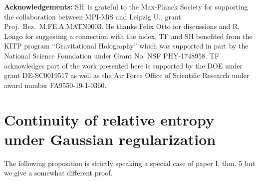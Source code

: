 \documentclass[english,a4paper,12pt]{article}
\begin{document}
\vspace{1cm}

{\bf Acknowledgements:} SH\ is grateful to the Max-Planck Society for supporting the collaboration between MPI-MiS and Leipzig U., grant Proj.~Bez.\ M.FE.A.MATN0003. He thanks Felix Otto for discussions and R. Longo for suggesting a connection with the index.
TF and SH benefited from the KITP program ``Gravitational Holography'' which was supported in part by the National Science Foundation under Grant No. NSF PHY-1748958.
TF acknowledges part of the work presented here is supported by the DOE under grant DE-SC0019517 as well as the Air Force Office of Scientific Research under award number FA9550-19-1-0360.



\appendix

\section{Continuity of relative entropy under Gaussian regularization}

The following proposition is strictly speaking a special case of paper I, thm. 5 but we give a somewhat different proof. 
\end{document}
